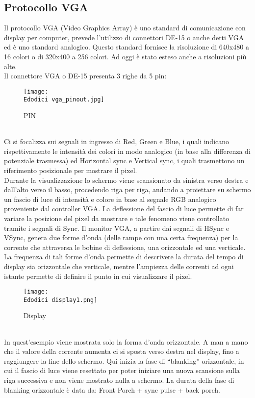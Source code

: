 \documentclass[12pt]{article}
\def \Edodici {Allegati/Esercizio12/}
\begin{document}
{\subsection{Protocollo VGA}
Il protocollo VGA (Video Graphics Array) è uno standard di comunicazione con display per computer, prevede l’utilizzo di connettori DE-15 o anche detti VGA ed è uno standard analogico. Questo standard fornisce la risoluzione di 640x480 a 16 colori o di 320x400 a 256 colori. Ad oggi è stato esteso anche a risoluzioni più alte.
\\Il connettore VGA o DE-15 presenta 3 righe da 5 pin:
\begin{figure}[ht!]
    \centering
    \texttt{[image: \\Edodici vga\_pinout.jpg]}
    \caption{PIN}
\end{figure}
\\Ci si focalizza sui segnali in ingresso di Red, Green e Blue, i quali indicano rispettivamente le intensità dei colori in modo analogico (in base alla differenza di potenziale trasmessa) ed Horizontal sync e Vertical sync, i quali trasmettono un riferimento posizionale per mostrare il pixel.
\\Durante la visualizzazione lo schermo viene scansionato da sinistra verso destra e dall’alto verso il basso, procedendo riga per riga, andando a proiettare su schermo un fascio di luce di intensità e colore in base al segnale RGB analogico proveniente dal controller VGA. La deflessione del fascio di luce permette di far variare la posizione del pixel da mostrare e tale fenomeno viene controllato tramite i segnali di Sync. Il monitor VGA, a partire dai segnali di HSync e VSync, genera due forme d’onda (delle rampe con una certa frequenza) per la corrente che attraversa le bobine di deflessione, una orizzontale ed una verticale. La frequenza di tali forme d’onda permette di descrivere la durata del tempo di display sia orizzontale che verticale, mentre l’ampiezza delle correnti ad ogni istante permette di definire il punto in cui visualizzare il pixel.
\begin{figure}[ht!]
    \centering
    \texttt{[image: \\Edodici display1.png]}
    \caption{Display}
\end{figure}
\\In quest’esempio viene mostrata solo la forma d’onda orizzontale. A man a mano che il valore della corrente aumenta ci si sposta verso destra nel display, fino a raggiungere la fine dello schermo. Qui inizia la fase di “blanking” orizzontale, in cui il fascio di luce viene resettato per poter iniziare una nuova scansione sulla riga successiva e non viene mostrato nulla a schermo. La durata della fase di blanking orizzontale è data da: Front Porch + sync pulse + back porch. 
}
\end{document}
